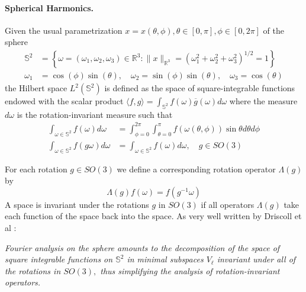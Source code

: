 \paragraph{Spherical Harmonics.}
 Given the usual parametrization $x = x(\theta, \phi), \theta\in[0,\pi], \phi\in[0,2\pi]$ of the sphere
\begin{align*}
\mathbb{S}^{2}&=\left\{\omega=\left(\omega_{1}, \omega_{2}, \omega_{3}\right) \in \mathbb{R}^{3} :\|x\|_{\mathbb{R}^{3}}=\left(\omega_{1}^{2}+\omega_{2}^{2}+\omega_{3}^{2}\right)^{1 / 2}=1\right\}\\
\omega_{1}&=\cos (\phi) \sin (\theta), \quad \omega_{2}=\sin (\phi) \sin (\theta), \quad \omega_{3}=\cos (\theta)
\end{align*}
the Hilbert space $L^2(\mathbb S^2)$ is defined as the space of square-integrable functions endowed with the scalar product $\langle f,g\rangle=\int_{\mathbb S^2}f(\omega)\overline g(\omega)d\omega$ where the measure $d\omega$ is the rotation-invariant measure such that
\begin{align}
\int_{\omega \in \mathbb S^{2}} f(\omega) d \omega&=\int_{\phi=0}^{2 \pi} \int_{\theta=0}^{\pi} f(\omega(\theta, \phi)) \sin \theta d \theta d \phi\\
\int_{\omega \in \mathbb S^{2}} f(g \omega) d \omega&=\int_{\omega \in \mathbb S^{2}} f(\omega) d \omega, \quad g \in S O(3)
\end{align}

For each rotation $g\in SO(3)$ we define a corresponding rotation operator $\Lambda(g)$ by
\begin{equation}\label{eq:rotation operator}
	\Lambda(g) f(\omega)=f\left(g^{-1} \omega\right)
\end{equation}
A space is invariant under the rotations $g$ in $SO(3)$ if all operators $\Lambda(g)$ take each function of the space back into the space. As very well written by Driscoll et al \cite{Driscoll:1994:CFT:184069.184073}:

\vspace{0.2cm}
\textit{Fourier analysis on the sphere amounts to the decomposition of the space of square integrable functions on \(\mathbb S^{2}\) in minimal subspaces $V_\ell$ invariant under all of the rotations in \(S O(3),\) thus simplifying the analysis of rotation-invariant operators.}
\vspace{0.2cm}

